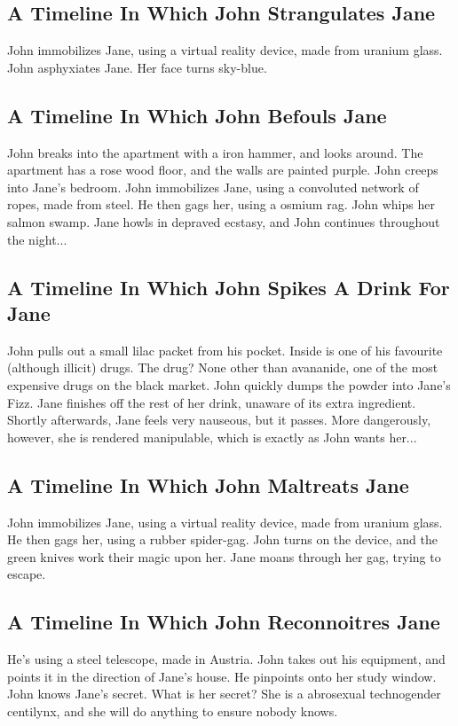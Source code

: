 \documentclass{article}
\begin{document}
\subsection{A Timeline In Which John Strangulates Jane}


John immobilizes Jane, using a virtual reality device, made from uranium glass.
John asphyxiates Jane.
Her face turns sky{-}blue.
\subsection{A Timeline In Which John Befouls Jane}


John breaks into the apartment with a iron hammer, and looks around.
The apartment has a rose wood floor, and the walls are painted purple.
John creeps into Jane's bedroom.
John immobilizes Jane, using a convoluted network of ropes, made from steel.
He then gags her, using a osmium rag.
John whips her salmon swamp.
Jane howls in depraved ecstasy, and John continues throughout the night...
\subsection{A Timeline In Which John Spikes A Drink For Jane}


John pulls out a small lilac packet from his pocket. Inside is one of his favourite (although illicit) drugs.
The drug? None other than avananide, one of the most expensive drugs on the black market.
John quickly dumps the powder into Jane's Fizz.
Jane finishes off the rest of her drink, unaware of its extra ingredient.
Shortly afterwards, Jane feels very nauseous, but it passes.
More dangerously, however, she is rendered manipulable, which is exactly as John wants her...
\subsection{A Timeline In Which John Maltreats Jane}


John immobilizes Jane, using a virtual reality device, made from uranium glass.
He then gags her, using a rubber spider{-}gag.
John turns on the device, and the green knives work their magic upon her.
Jane moans through her gag, trying to escape.
\subsection{A Timeline In Which John Reconnoitres Jane}


He's using a steel telescope, made in Austria.
John takes out his equipment, and points it in the direction of Jane's house. He pinpoints onto her study window.
John knows Jane's secret. What is her secret? She is a abrosexual technogender centilynx, and she will do anything to ensure nobody knows.
\end{document}
